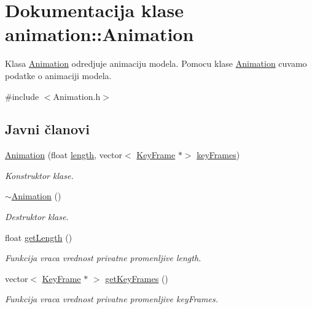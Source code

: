\hypertarget{classanimation_1_1Animation}{}\section{Dokumentacija klase animation\+:\+:Animation}
\label{classanimation_1_1Animation}


Klasa \hyperlink{classanimation_1_1Animation}{Animation} odredjuje animaciju modela. Pomocu klase \hyperlink{classanimation_1_1Animation}{Animation} cuvamo podatke o animaciji modela.  




{\ttfamily \#include $<$Animation.\+h$>$}

\subsection*{Javni članovi}
\begin{DoxyCompactItemize}
\item 
\hyperlink{classanimation_1_1Animation_a82667067e10341fa3843e5a61badec1c}{Animation} (float \hyperlink{classanimation_1_1Animation_a2e08946f67829d6907b204f70d94a6ec}{length}, vector$<$ \hyperlink{classanimation_1_1KeyFrame}{Key\+Frame} $\ast$$>$ \hyperlink{classanimation_1_1Animation_a371ea96eed842fd75e5c36cc757c232d}{key\+Frames})
\begin{DoxyCompactList}\small\item\em Konstruktor klase. \end{DoxyCompactList}\item 
\hyperlink{classanimation_1_1Animation_a558c8041047da1b0fbe573a934b270d3}{$\sim$\+Animation} ()
\begin{DoxyCompactList}\small\item\em Destruktor klase. \end{DoxyCompactList}\item 
float \hyperlink{classanimation_1_1Animation_a8af39eddf1bec211e7b7252a770a2d4c}{get\+Length} ()
\begin{DoxyCompactList}\small\item\em Funkcija vraca vrednost privatne promenljive length. \end{DoxyCompactList}\item 
vector$<$ \hyperlink{classanimation_1_1KeyFrame}{Key\+Frame} $\ast$ $>$ \hyperlink{classanimation_1_1Animation_ae8d6214ee3a10015f12b7aa7c6e5c1b7}{get\+Key\+Frames} ()
\begin{DoxyCompactList}\small\item\em Funkcija vraca vrednost privatne promenljive key\+Frames. \end{DoxyCompactList}\end{DoxyCompactItemize}

